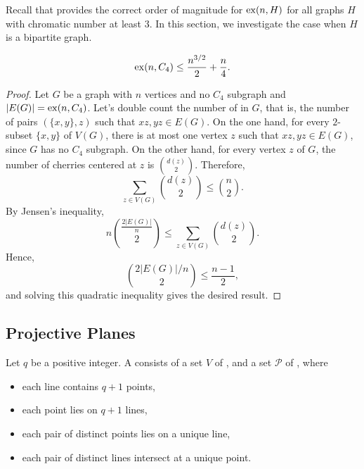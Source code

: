 Recall that  provides the correct order of magnitude for \(\operatorname{ex}(n, H)\) for all graphs \(H\) with chromatic number at least \(3\).
In this section, we investigate the case when \(H\) is a bipartite graph.

\begin{theorem}
    \begin{equation}
        \operatorname{ex}(n, C_4) \leq \frac{n^{3/2}}{2} + \frac{n}{4}.
    \end{equation}
\end{theorem}

\begin{proof}
    Let \(G\) be a graph with \(n\) vertices and no \(C_4\) subgraph
    and \(|E(G)| = \operatorname{ex}(n, C_4)\).
    Let's double count the number of  in \(G\),
    that is, the number of pairs \((\{x, y\}, z)\) such that \(xz, yz \in E(G)\).
    On the one hand, for every \(2\)-subset \(\{x, y\}\) of \(V(G)\),
    there is at most one vertex \(z\) such that \(xz, yz \in E(G)\),
    since \(G\) has no \(C_4\) subgraph.
    On the other hand, for every vertex \(z\) of \(G\),
    the number of cherries centered at \(z\) is \(\binom{d(z)}{2}\).
    Therefore, 
    \begin{equation}
        \sum_{z \in V(G)} \binom{d(z)}{2} \leq \binom{n}{2}.
    \end{equation}
    By Jensen's inequality,
    \begin{equation}
        n\binom{\frac{2|E(G)|}{n}}{2} \leq \sum_{z \in V(G)} \binom{d(z)}{2}.
    \end{equation}
    Hence,
    \begin{equation}
        \binom{2|E(G)|/n}{2} \leq \frac{n-1}{2},
    \end{equation}
    and solving this quadratic inequality gives the desired result.
\end{proof}

\subsection{Projective Planes}

\begin{definition}
    Let \(q\) be a positive integer.
    A  consists of a set \(V\) of , and a set \(\mathcal{P}\) of ,
    where
    \begin{itemize}
        \item \label{def:projective-plane-1} each line contains \(q+1\) points,
        \item \label{def:projective-plane-2} each point lies on \(q+1\) lines,
        \item \label{def:projective-plane-3} each pair of distinct points lies on a unique line,
        \item \label{def:projective-plane-4} each pair of distinct lines intersect at a unique point.
    \end{itemize}
\end{definition}


